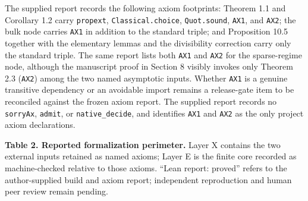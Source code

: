 \documentclass[
  11pt,
]{article}
\begin{document}
The supplied report records the following axiom footprints: Theorem 1.1
and Corollary 1.2 carry \texttt{propext}, \texttt{Classical.choice},
\texttt{Quot.sound}, \texttt{AX1}, and \texttt{AX2}; the bulk node
carries \texttt{AX1} in addition to the standard triple; and Proposition
10.5 together with the elementary lemmas and the divisibility correction
carry only the standard triple. The same report lists both \texttt{AX1}
and \texttt{AX2} for the sparse-regime node, although the manuscript
proof in Section 8 visibly invokes only Theorem 2.3 (\texttt{AX2}) among
the two named asymptotic inputs. Whether \texttt{AX1} is a genuine
transitive dependency or an avoidable import remains a release-gate item
to be reconciled against the frozen axiom report. The supplied report
records no \texttt{sorryAx}, \texttt{admit}, or \texttt{native\_decide},
and identifies \texttt{AX1} and \texttt{AX2} as the only project axiom
declarations.

\textbf{Table 2. Reported formalization perimeter.} Layer X contains the
two external inputs retained as named axioms; Layer E is the finite core
recorded as machine-checked relative to those axioms. ``Lean report:
proved'' refers to the author-supplied build and axiom report;
independent reproduction and human peer review remain pending.
\end{document}
